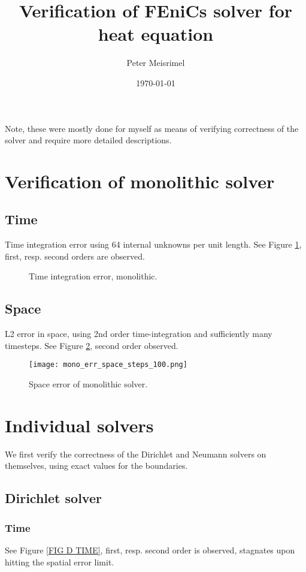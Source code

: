\documentclass[a4paper,10pt]{article}
\title{Verification of FEniCs solver for heat equation}
\author{Peter Meisrimel}
\date{\today}
\begin{document}
\maketitle
\tableofcontents
\newpage

Note, these were mostly done for myself as means of verifying correctness of the solver and require more detailed descriptions.
\section{Verification of monolithic solver}
\FloatBarrier
\subsection{Time}
Time integration error using 64 internal unknowns per unit length. See Figure \ref{FIG MONO TIME}, first, resp. second orders are observed.

\begin{figure}[ht!]
\label{FIG MONO TIME}
\caption{Time integration error, monolithic.}
\end{figure}
% 
\FloatBarrier
\subsection{Space}
L2 error in space, using 2nd order time-integration and sufficiently many timesteps. See Figure \ref{FIG MONO SPACE}, second order observed.

\begin{figure}[ht!]
\begin{center}
\texttt{[image: mono\_err\_space\_steps\_100.png]}
\label{FIG MONO SPACE}
\caption{Space error of monolithic solver.}
\end{center}
\end{figure}
% 
\FloatBarrier
\section{Individual solvers}
We first verify the correctness of the Dirichlet and Neumann solvers on themselves, using exact values for the boundaries.
% 
\FloatBarrier
\subsection{Dirichlet solver}
% 
\FloatBarrier
\subsubsection{Time}
See Figure \ref{FIG D TIME}, first, resp. second order is observed, stagnates upon hitting the spatial error limit.
\end{document}
